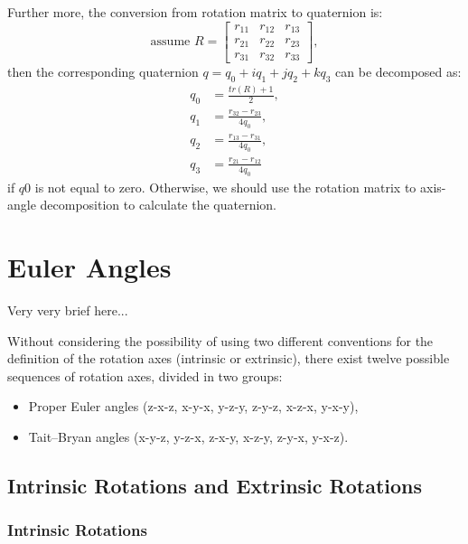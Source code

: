 \documentclass{article}
\begin{document}
Further more, the conversion from rotation matrix to quaternion is:
\begin{displaymath}
  \text{assume } R = \begin{bmatrix}
    r_{11} & r_{12} & r_{13} \\
    r_{21} & r_{22} & r_{23} \\
    r_{31} & r_{32} & r_{33}
  \end{bmatrix},
\end{displaymath}
then the corresponding quaternion $q = q_0+iq_1+jq_2+kq_3$ can be decomposed as:
\begin{equation}
  \begin{split}
    q_0 &= \frac{tr(R)+1}{2},    \\
    q_1 &= \frac{r_{32}-r_{23}}{4q_0}, \\
    q_2 &= \frac{r_{13}-r_{31}}{4q_0}, \\
    q_3 &= \frac{r_{21}-r_{12}}{4q_0}
  \end{split}
\end{equation}
if $q0$ is not equal to zero. Otherwise, we should use the rotation matrix to axis-angle decomposition to calculate the quaternion.

\section{Euler Angles}

Very very brief here...

Without considering the possibility of using two different conventions for the definition of the rotation axes (intrinsic or extrinsic), there exist twelve possible sequences of rotation axes, divided in two groups:

\begin{itemize}
\item Proper Euler angles (z-x-z, x-y-x, y-z-y, z-y-z, x-z-x, y-x-y),
\item Tait–Bryan angles (x-y-z, y-z-x, z-x-y, x-z-y, z-y-x, y-x-z).
\end{itemize}


\subsection{Intrinsic Rotations and Extrinsic Rotations}

\subsubsection*{Intrinsic Rotations}
\end{document}
